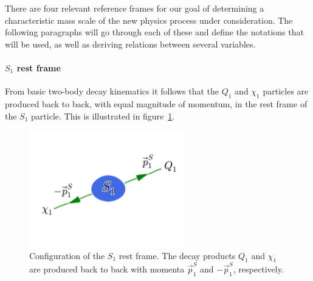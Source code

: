 There are four relevant reference frames for our goal of determining a characteristic mass scale
of the new physics process under consideration. The following paragraphs will go through each of
these and define the notations that will be used, as well as deriving relations between several
variables. 

\paragraph{$S_1$ rest frame} 
From basic two-body decay kinematics it follows that the $Q_1$ and $\chi_1$ particles are produced
back to back, with equal magnitude of momentum, in the rest frame of the $S_1$ particle. This is
illustrated in figure~\ref{fig:razor_S1_rest_frame}. 

\begin{figure}[htpb]
  \centering
  \includegraphics[width=0.6\textwidth,clip=true,trim=0 4cm 0
3cm]{figures/razor_variables/rest_frame}
  \caption{Configuration of the $S_1$ rest frame. The decay products $Q_1$ and $\chi_1$ are
produced back to back with momenta $\vec{p}^S_1$ and $-\vec{p}^S_1$, respectively. 
\label{fig:razor_S1_rest_frame}}
\end{figure}

